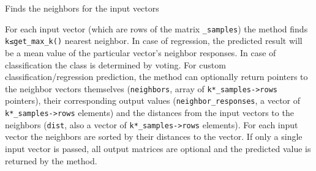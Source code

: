 
Finds the neighbors for the input vectors


For each input vector (which are rows of the matrix \texttt{\_samples}) the method finds \texttt{k≤get\_max\_k()} nearest neighbor. In case of regression, the predicted result will be a mean value of the particular vector's neighbor responses. In case of classification the class is determined by voting.
\newline
\newline
For custom classification/regression prediction, the method can optionally return pointers to the neighbor vectors themselves (\texttt{neighbors}, array of \texttt{k*\_samples->rows} pointers), their corresponding output values (\texttt{neighbor\_responses}, a vector of \texttt{k*\_samples->rows} elements) and the distances from the input vectors to the neighbors (\texttt{dist}, also a vector of \texttt{k*\_samples->rows} elements).
\newline
\newline
For each input vector the neighbors are sorted by their distances to the vector.
\newline
\newline
If only a single input vector is passed, all output matrices are optional and the predicted value is returned by the method.




